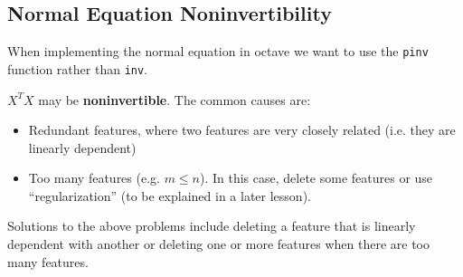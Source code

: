 \subsection{Normal Equation Noninvertibility}
When implementing the normal equation in octave we want to use the \verb|pinv| function rather than \verb|inv|.

$X^TX$ may be {\bf noninvertible}. The common causes are:
\begin{itemize}
	\item Redundant features, where two features are very closely related (i.e. they are linearly dependent)
	\item Too many features (e.g. $m\leq n$). In this case, delete some features or use ``regularization'' (to be explained in a later lesson).
\end{itemize}
Solutions to the above problems include deleting a feature that is linearly dependent with another or deleting one or more features when there are too many features.